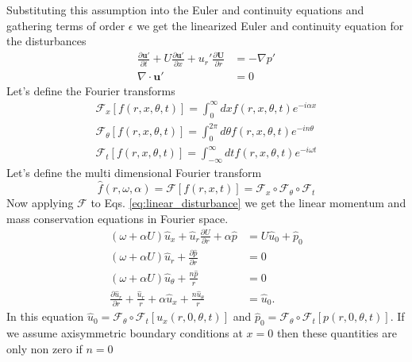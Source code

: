 \documentclass[superscriptaddress, onecolumn, prl]{revtex4}
\begin{document}
Substituting this assumption into the Euler and continuity equations and gathering terms of order $\epsilon$ we get the linearized Euler and continuity equation for the disturbances
\begin{equation}
\begin{split}
\label{eq:linear_disturbance}
\frac{\partial \textbf{u}' }{\partial t} + U \frac{\partial \textbf{u}'}{\partial x} + u_r' \frac{\partial \textbf{U}}{\partial r} &= -\nabla p' \\
\nabla \cdot \textbf{u}' &= 0 
\end{split}
\end{equation}
Let's define the Fourier transforms
\begin{equation}
\begin{array}{rrr}
\mathscr{F}_x[f(r,x,\theta,t)] = \int_{0}^{\infty}dx f(r,x,\theta,t) e^{-i \alpha x} \\
\mathscr{F}_{\theta}[f(r,x,\theta,t)] = \int_{0}^{2 \pi}d\theta f(r,x,\theta,t) e^{-i n \theta} \\
\mathscr{F}_{t}[f(r,x,\theta,t)] = \int_{-\infty}^{\infty}dt f(r,x,\theta,t) e^{-i \omega t}
\end{array}
\end{equation}
Let's define the multi dimensional Fourier transform
\begin{equation}
\hat{f}(r, \omega, \alpha) = \mathscr{F}[f(r, x, t)] = \mathscr{F}_x \circ \mathscr{F}_{\theta} \circ \mathscr{F}_t 
\end{equation}
Now applying $\mathscr{F}$ to Eqs. \ref{eq:linear_disturbance} we get the linear momentum and mass conservation equations in Fourier space.
\begin{equation}
\label{eq:linear1}
\begin{split}
(\omega + \alpha U) \hat{u}_x + \hat{u}_r \frac{\partial U}{\partial r} + \alpha \hat{p} &= U \hat{u}_0 + \hat{p}_0 \\
(\omega + \alpha U) \hat{u}_r + \frac{\partial \hat{p}}{\partial r} &= 0 \\ 
(\omega + \alpha U) \hat{u}_{\theta} + \frac{n\hat{p}}{r} &= 0 \\ 
\frac{\partial \hat{u}_r}{\partial r} + \frac{\hat{u}_r}{r} + \alpha \hat{u}_x + \frac{n \hat{u}_{\theta}}{r} &= \hat{u}_0.
\end{split}
\end{equation}
In this equation $\hat{u}_0 = \mathscr{F}_{\theta} \circ \mathscr{F}_t [u_x(r, 0, \theta, t)]$ and $\hat{p}_0 = \mathscr{F}_{\theta} \circ \mathscr{F}_t [p(r, 0, \theta, t)]$. If we assume axisymmetric boundary conditions at $x=0$ then these quantities are only non zero if $n=0$
\end{document}
